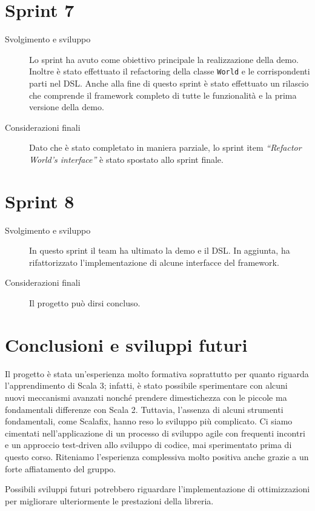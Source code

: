 \section{Sprint 7}\label{sec:sprint-7}
\begin{description}
    \item[Svolgimento e sviluppo] Lo sprint ha avuto come obiettivo principale la realizzazione della demo.
    Inoltre è stato effettuato il refactoring della classe \texttt{World} e le corrispondenti parti nel DSL\@.
    Anche alla fine di questo sprint è stato effettuato un rilascio che comprende il framework completo di tutte le
    funzionalità e la prima versione della demo.
    \item[Considerazioni finali] Dato che è stato completato in maniera parziale, lo sprint item
    \textit{``Refactor World's interface''} è stato spostato allo sprint finale.
\end{description}
\section{Sprint 8}\label{sec:sprint-8}
\begin{description}
    \item[Svolgimento e sviluppo] In questo sprint il team ha ultimato la demo e il DSL. In aggiunta, ha rifattorizzato
    l'implementazione di alcune interfacce del framework.
    \item[Considerazioni finali] Il progetto può dirsi concluso.
\end{description}

\section{Conclusioni e sviluppi futuri}
Il progetto è stata un'esperienza molto formativa soprattutto per quanto riguarda l'apprendimento di Scala 3;
infatti, è stato possibile sperimentare con alcuni nuovi meccanismi avanzati nonché prendere dimestichezza con le
piccole ma fondamentali differenze con Scala 2.
Tuttavia, l'assenza di alcuni strumenti fondamentali, come Scalafix, hanno reso lo sviluppo più complicato.
Ci siamo cimentati nell'applicazione di un processo di sviluppo agile con frequenti incontri e un approccio
test-driven allo sviluppo di codice, mai sperimentato prima di questo corso.
Riteniamo l'esperienza complessiva molto positiva anche grazie a un forte affiatamento del gruppo.

Possibili sviluppi futuri potrebbero riguardare l'implementazione di ottimizzazioni per migliorare ulteriormente
le prestazioni della libreria.
